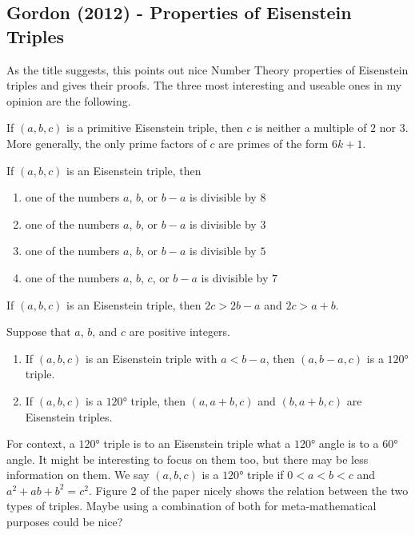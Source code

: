 \documentclass[12pt]{article}
\begin{document}
\subsection{Gordon (2012) - Properties of Eisenstein Triples}
As the title suggests, this points out nice Number Theory properties of Eisenstein triples and gives their proofs. The three most interesting and useable ones in my opinion are the following.
\begin{thm}{}{} %
    If $(a,b,c)$ is a primitive Eisenstein triple, then $c$ is neither a multiple of $2$ nor $3$. More generally, the only prime factors of $c$ are primes of the form $6k + 1$.
\end{thm}
\begin{thm}{}{}
If $(a,b,c)$ is an Eisenstein triple, then
\begin{enumerate}
    \item one of the numbers $a$, $b$, or $b-a$ is divisible by $8$
    \item one of the numbers $a$, $b$, or $b-a$ is divisible by $3$
    \item one of the numbers $a$, $b$, or $b-a$ is divisible by $5$
    \item one of the numbers $a$, $b$, $c$, or $b-a$ is divisible by $7$
\end{enumerate}
\end{thm}
\begin{thm}{}{}
    If $(a,b,c)$ is an Eisenstein triple, then $2c > 2b - a$ and $2c > a + b$.
\end{thm}
\begin{thm}{}{}
    Suppose that $a$, $b$, and $c$ are positive integers.
    \begin{enumerate}
        \item If $(a,b,c)$ is an Eisenstein triple with $a<b-a$, then $(a,b-a,c)$ is a $120$° triple.
        \item If $(a,b,c)$ is a $120$° triple, then $(a, a+b, c)$ and $(b,a+b,c)$ are Eisenstein triples.
    \end{enumerate}
\end{thm}
For context, a $120$° triple is to an Eisenstein triple what a $120$° angle is to a $60$° angle. It might be interesting to focus on them too, but there may be less information on them. We say $(a,b,c)$ is a $120$° triple if $0<a<b<c$ and $a^2 + ab + b^2 = c^2$. Figure 2 of the paper nicely shows the relation between the two types of triples. Maybe using a combination of both for meta-mathematical purposes could be nice?
\end{document}
